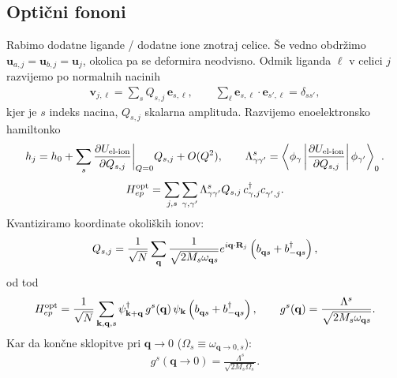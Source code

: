 \documentclass[a4paper,10pt]{article}
\renewcommand{\vec}[1]{\mathbf{#1}}
\begin{document}
\subsection{Optični fononi}
Rabimo dodatne ligande / dodatne ione znotraj celice. Še vedno obdržimo $\vec u_{a,j}=\vec u_{b,j}=\vec u_j$, okolica pa se deformira neodvisno. Odmik liganda $\ell$ v celici $j$ razvijemo po normalnih nacinih
\begin{align}
  \vec v_{j,\ell} = \sum_s Q_{s,j}\, \vec e_{s,\ell}, \qquad \sum_\ell \vec e_{s,\ell}\cdot\vec e_{s',\ell} = \delta_{ss'},
\end{align}
kjer je $s$ indeks nacina, $Q_{s,j}$ skalarna amplituda. Razvijemo enoelektronsko hamiltonko
\begin{align}
  h_j=h_0+\sum_s \pdv{U_{\text{el-ion}}}{Q_{s,j}}\bigg|_{Q=0} Q_{s,j}+O(Q^2), \qquad \Lambda^{s}_{\gamma\gamma'} = \left\langle\phi_\gamma\left| \pdv{U_{\text{el-ion}}}{Q_{s,j}} \right|\phi_{\gamma'}\right\rangle_0 .
\end{align}
\begin{align}
  H_{ep}^{\mathrm{opt}} = \sum_{j, s} \sum_{\gamma, \gamma'} \Lambda^{s}_{\gamma\gamma'} Q_{s,j} \, c_{\gamma,j}^\dagger c_{\gamma',j}^{\vphantom\dagger}.
\end{align}
Kvantiziramo koordinate okoliških ionov:
\begin{align}
  Q_{s,j}= \frac1{\sqrt N} \sum_{\vec q} \frac{1}{\sqrt{2M_s\omega_{\vec q s}}} e^{i\vec q\cdot\vec R_j} \left(b^{\vphantom{\dagger}}_{\vec q s}+b_{-\vec q s}^\dagger\right),
\end{align}
od tod
\begin{align}
  H_{ep}^{\mathrm{opt}} = \frac1{\sqrt N}\sum_{\vec k,\vec q, s} \psi_{\vec k+\vec q}^\dagger \, g^{s}(\vec q) \, \psi_{\vec k} \left(b^{\vphantom{\dagger}}_{\vec q s}+b_{-\vec q s}^\dagger\right), \qquad g^{s}(\vec q) = \frac{\Lambda^{s}}{\sqrt{2M_s\omega_{\vec q s}}}.
\end{align}
Kar da končne sklopitve pri $\vec q \to 0$ ($\Omega_s \equiv \omega_{\vec q\to 0, s}$):
\begin{align}
  g^{s}(\vec q\to0) = \frac{\Lambda^{s}}{\sqrt{2M_s\Omega_s}}.
\end{align}
\end{document}
